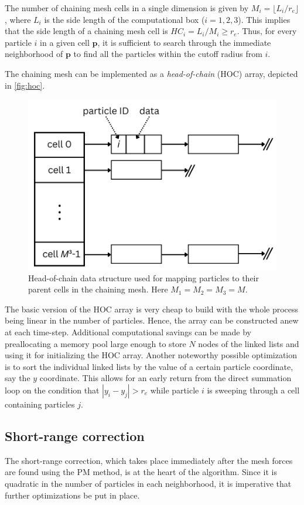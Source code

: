 The number of chaining mesh cells in a single dimension is given by $M_i = \lfloor L_i / r_e \rfloor$, where $L_i$ is the side length of the computational box ($i=1,2,3$).
This implies that the side length of a chaining mesh cell is $HC_i = L_i / M_i \geq r_e$.
Thus, for every particle $i$ in a given cell $\mathbf{p}$, it is sufficient to search through the immediate neighborhood of $\mathbf{p}$ to find all the particles within the cutoff radius from $i$.

The chaining mesh can be implemented as a \textit{head-of-chain} (HOC) array, depicted in \autoref{fig:hoc}.
\begin{figure}[htp]
    \centering
    \includegraphics[scale=0.25]{img/hoc.png}
    \caption{Head-of-chain data structure used for mapping particles to their parent cells in the chaining mesh.
        Here $M_1=M_2=M_3 = M$.}
    \label{fig:hoc}
\end{figure}
The basic version of the HOC array is very cheap to build with the whole process being linear in the number of particles.
Hence, the array can be constructed anew at each time-step.
Additional computational savings can be made by preallocating a memory pool large enough to store $N$ nodes of the linked lists and using it for initializing the HOC array.
Another noteworthy possible optimization is to sort the individual linked lists by the value of a certain particle coordinate, say the $y$ coordinate.
This allows for an early return from the direct summation loop on the condition that $|y_i - y_j| > r_e$ while particle $i$ is sweeping through a cell containing particles $j$.

\subsection{Short-range correction}
The short-range correction, which takes place immediately after the mesh forces are found using the PM method, is at the heart of the \PThreeM{} algorithm.
Since it is quadratic in the number of particles in each neighborhood, it is imperative that further optimizations be put in place.

